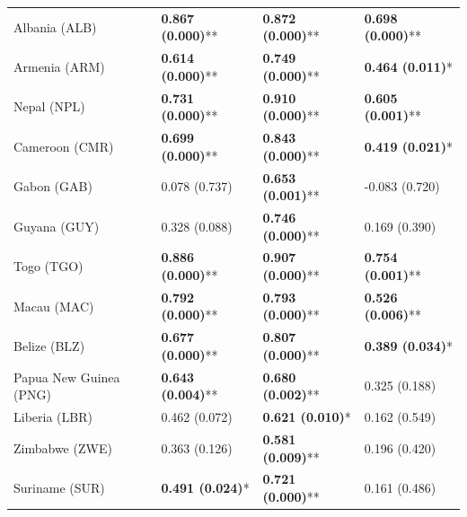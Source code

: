 \begin{longtable}{p{5cm}p{3cm}p{3cm}p{5cm}}
Albania (ALB) & \textcolor{atlLime600}{\textbf{0.867 (0.000)}**} & \textcolor{atlLime600}{\textbf{0.872 (0.000)}**} & \textcolor{atlLime600}{\textbf{0.698 (0.000)}**} \\
Armenia (ARM) & \textcolor{atlLime600}{\textbf{0.614 (0.000)}**} & \textcolor{atlLime600}{\textbf{0.749 (0.000)}**} & \textcolor{atlLime600}{\textbf{0.464 (0.011)}*} \\
Nepal (NPL) & \textcolor{atlLime600}{\textbf{0.731 (0.000)}**} & \textcolor{atlLime600}{\textbf{0.910 (0.000)}**} & \textcolor{atlLime600}{\textbf{0.605 (0.001)}**} \\
Cameroon (CMR) & \textcolor{atlLime600}{\textbf{0.699 (0.000)}**} & \textcolor{atlLime600}{\textbf{0.843 (0.000)}**} & \textcolor{atlLime600}{\textbf{0.419 (0.021)}*} \\
Gabon (GAB) & \textcolor{atlOrange600}{0.078 (0.737)} & \textcolor{atlLime600}{\textbf{0.653 (0.001)}**} & \textcolor{atlOrange600}{-0.083 (0.720)} \\
Guyana (GUY) & \textcolor{atlOrange600}{0.328 (0.088)} & \textcolor{atlLime600}{\textbf{0.746 (0.000)}**} & \textcolor{atlOrange600}{0.169 (0.390)} \\
Togo (TGO) & \textcolor{atlLime600}{\textbf{0.886 (0.000)}**} & \textcolor{atlLime600}{\textbf{0.907 (0.000)}**} & \textcolor{atlLime600}{\textbf{0.754 (0.001)}**} \\
Macau (MAC) & \textcolor{atlLime600}{\textbf{0.792 (0.000)}**} & \textcolor{atlLime600}{\textbf{0.793 (0.000)}**} & \textcolor{atlLime600}{\textbf{0.526 (0.006)}**} \\
Belize (BLZ) & \textcolor{atlLime600}{\textbf{0.677 (0.000)}**} & \textcolor{atlLime600}{\textbf{0.807 (0.000)}**} & \textcolor{atlLime600}{\textbf{0.389 (0.034)}*} \\
Papua New Guinea (PNG) & \textcolor{atlLime600}{\textbf{0.643 (0.004)}**} & \textcolor{atlLime600}{\textbf{0.680 (0.002)}**} & \textcolor{atlOrange600}{0.325 (0.188)} \\
Liberia (LBR) & \textcolor{atlOrange600}{0.462 (0.072)} & \textcolor{atlLime600}{\textbf{0.621 (0.010)}*} & \textcolor{atlOrange600}{0.162 (0.549)} \\
Zimbabwe (ZWE) & \textcolor{atlOrange600}{0.363 (0.126)} & \textcolor{atlLime600}{\textbf{0.581 (0.009)}**} & \textcolor{atlOrange600}{0.196 (0.420)} \\
Suriname (SUR) & \textcolor{atlLime600}{\textbf{0.491 (0.024)}*} & \textcolor{atlLime600}{\textbf{0.721 (0.000)}**} & \textcolor{atlOrange600}{0.161 (0.486)} \\

\end{longtable}
